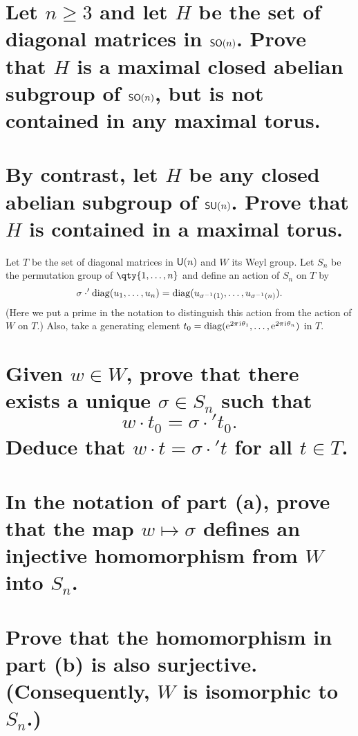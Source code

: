 \documentclass[
	pages,
	boxes,
	color=WildStrawberry
]{homework}
\begin{document}
\begin{problem}
\begin{parts}
	\part{Let $n \geq 3$ and let $H$ be the set of diagonal matrices in $\mathsf{SO}(n)$. Prove that $H$ is a maximal closed abelian subgroup of $\mathsf{SO}(n)$, but is not contained in any maximal torus.}\label{part:5a}
	\part{By contrast, let $H$ be any closed abelian subgroup of $\mathsf{SU}(n)$. Prove that $H$ is contained in a maximal torus.}\label{part:5b}
\end{parts}
\end{problem}

\begin{solution}
	\ref{part:5a}

	\ref{part:5b}
\end{solution}

\begin{problem}
Let $T$ be the set of diagonal matrices in $\mathsf{U}(n)$ and $W$ its Weyl group. Let $S_n$ be the permutation group of $\qty{1, \ldots, n}$ and define an action of $S_n$ on $T$ by
\[
	\sigma \cdot' \operatorname{diag}(u_1, \ldots, u_n) = \operatorname{diag}(u_{\sigma^{-1}(1)}, \ldots, u_{\sigma^{-1}(n)}).
\]
(Here we put a prime in the notation to distinguish this action from the action of $W$ on $T$.) Also, take a generating element $t_0 = \operatorname{diag}(\mathrm{e}^{2\pi\mkern1mu\mathrm{i}\mkern1mu \theta_1}, \ldots, \mathrm{e}^{2\pi\mkern1mu\mathrm{i}\mkern1mu \theta_n})$ in $T$.
\begin{parts}
	\part{Given $w \in W$, prove that there exists a unique $\sigma \in S_n$ such that
		\[
			w \cdot t_0 = \sigma \cdot' t_0.
		\]
		Deduce that $w \cdot t = \sigma \cdot' t$ for all $t \in T$.}\label{part:6a}
	\part{In the notation of part (a), prove that the map $w \mapsto \sigma$ defines an injective homomorphism from $W$ into $S_n$.}\label{part:6b}
	\part{Prove that the homomorphism in part (b) is also surjective. (Consequently, $W$ is isomorphic to $S_n$.)}\label{part:6c}
\end{parts}
\end{problem}
\end{document}
